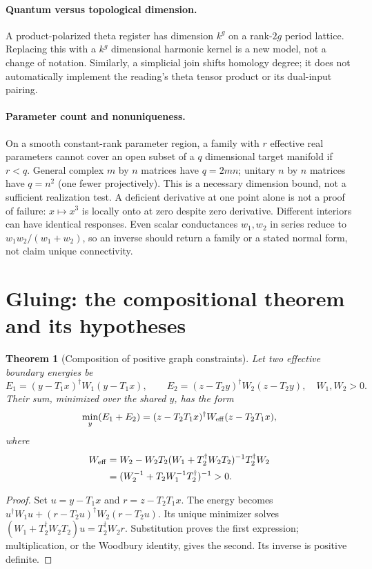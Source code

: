 \documentclass[11pt]{article}
\newtheorem{theorem}{Theorem}[section]
\theoremstyle{definition}
\begin{document}
\paragraph{Quantum versus topological dimension.}
A product-polarized theta register has dimension $k^g$ on a rank-$2g$
period lattice. Replacing this with a $k^g$ dimensional harmonic kernel
is a new model, not a change of notation. Similarly, a simplicial join
shifts homology degree; it does not automatically implement the reading's
theta tensor product or its dual-input pairing.

\paragraph{Parameter count and nonuniqueness.}
On a smooth constant-rank parameter region, a family with $r$ effective
real parameters cannot cover an open subset of a $q$ dimensional target
manifold if $r<q$. General complex $m$ by $n$ matrices have $q=2mn$;
unitary $n$ by $n$ matrices have $q=n^2$ (one fewer projectively).
This is a necessary dimension bound, not a sufficient realization test.
A deficient derivative at one point alone is not a proof of failure:
$x\mapsto x^3$ is locally onto at zero despite zero derivative.
Different interiors can have identical responses. Even scalar
conductances $w_1,w_2$ in series reduce to $w_1w_2/(w_1+w_2)$, so an
inverse should return a family or a stated normal form, not claim
unique connectivity.

\section{Gluing: the compositional theorem and its hypotheses}\label{sec:gluing}
\begin{theorem}[Composition of positive graph constraints]\label{thm:gluing}
Let two effective boundary energies be
\[
 E_1=(y-T_1x)^\dagger W_1(y-T_1x),\qquad
 E_2=(z-T_2y)^\dagger W_2(z-T_2y),\quad W_1,W_2>0.
\]
Their sum, minimized over the shared $y$, has the form
\[
 \min_y(E_1+E_2)
 =(z-T_2T_1x)^\dagger W_{\rm eff}(z-T_2T_1x),
\]
where
\begin{equation}\label{eq:weff}
\begin{split}
 W_{\rm eff}
 &=W_2-W_2T_2(W_1+T_2^\dagger W_2T_2)^{-1}T_2^\dagger W_2\\
 &=(W_2^{-1}+T_2W_1^{-1}T_2^\dagger)^{-1}>0.
\end{split}
\end{equation}
\end{theorem}
\begin{proof}
Set $u=y-T_1x$ and $r=z-T_2T_1x$. The energy becomes
$u^\dagger W_1u+(r-T_2u)^\dagger W_2(r-T_2u)$.
Its unique minimizer solves
$(W_1+T_2^\dagger W_2T_2)u=T_2^\dagger W_2r$.
Substitution proves the first expression; multiplication, or the
Woodbury identity, gives the second. Its inverse is positive definite.
\end{proof}
\end{document}
